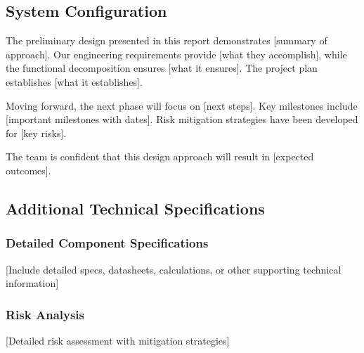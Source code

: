 \documentclass[final]{designreport}
\begin{document}
\subsection{System Configuration}



The preliminary design presented in this report demonstrates [summary of approach]. Our engineering requirements provide [what they accomplish], while the functional decomposition ensures [what it ensures]. The project plan establishes [what it establishes].

Moving forward, the next phase will focus on [next steps]. Key milestones include [important milestones with dates]. Risk mitigation strategies have been developed for [key risks].

The team is confident that this design approach will result in [expected outcomes].

\printbibliography

\makeappendix

\subsection{Additional Technical Specifications}

\subsubsection{Detailed Component Specifications}
[Include detailed specs, datasheets, calculations, or other supporting technical information]

\subsubsection{Risk Analysis}
[Detailed risk assessment with mitigation strategies]
\end{document}
